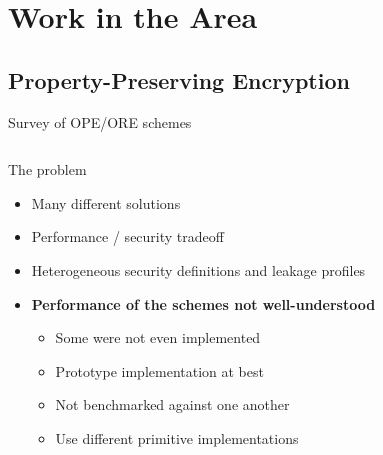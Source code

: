 
\section{Work in the Area}

	\subsection{Property-Preserving Encryption}

		\begin{frame}{Survey of OPE/ORE schemes~\cite{ore-benchmark-17}}

			\begin{columns}[T,onlytextwidth]

					\begin{block}{The problem}

						\begin{itemize}
							\item Many different solutions
							\item Performance / security tradeoff
							\item Heterogeneous security definitions and leakage profiles
							\item \textbf{Performance of the schemes not well-understood}
							\begin{itemize}
								\item Some were not even implemented
								\item Prototype implementation at best
								\item Not benchmarked against one another
								\item Use different primitive implementations
							\end{itemize}
						\end{itemize}

					\end{block}


\end{columns}
\end{frame}
